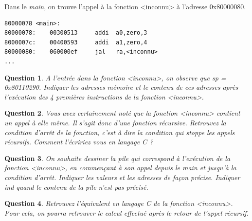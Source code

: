 \documentclass[a4paper, 11pt]{article}
\newtheorem{question}{Question}
\begin{document}
Dans le \textit{main}, on trouve l'appel à la fonction <inconnu> à l'adresse 0x80000080.

\begin{lstlisting}
80000078 <main>:
80000078:    00300513     addi  a0,zero,3
8000007c:    00400593     addi  a1,zero,4
80000080:    060000ef     jal   ra,<inconnu>
...
\end{lstlisting}

\begin{question}
A l’entrée dans la fonction <inconnu>, on observe que sp = 0x80110290. Indiquer les adresses mémoire et le contenu de ces adresses après l'exécution des 4 premières instructions de la fonction <inconnu>.
\end{question}


\begin{question}
Vous avez certainement noté que la fonction <inconnu> contient un appel à elle même. Il s'agit donc d'une fonction récursive.
Retrouvez la condition d'arrêt de la fonction, c'est à dire la condition qui stoppe les appels récursifs. Comment l'écririez vous en langage C ?
\end{question}


\begin{question}
On souhaite dessiner la pile qui correspond à l’exécution de la fonction <inconnu>, en commençant à son appel depuis le main et jusqu'à la condition d'arrêt. 
Indiquer les valeurs et les adresses de façon précise. Indiquer ind quand le contenu de la pile n’est pas précisé.


\end{question}


\begin{question}
Retrouvez l'équivalent en langage C de la fonction <inconnu>. Pour cela, on pourra retrouver le calcul effectué après le retour de l'appel récursif.


\end{question}
\end{document}

